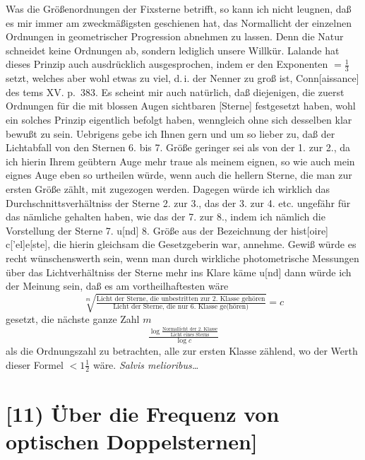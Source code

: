 \documentclass[12pt,a4paper]{article}
\theoremstyle{plain}
\theoremstyle{definition}
\theoremstyle{remark}
\begin{document}
Was die Gr\"o\ss enordnungen der Fixsterne betrifft, so kann ich nicht leugnen, da\ss{} es mir immer am zweckm\"a\ss igsten geschienen hat, das Normallicht der einzelnen Ordnungen in geometrischer Progression abnehmen zu lassen. Denn die Natur schneidet keine Ordnungen ab, sondern lediglich unsere Willk\"ur. Lalande hat dieses Prinzip auch ausdr\"ucklich ausgesprochen, indem er den Exponenten $= \tfrac{1}{3}$ setzt, welches aber wohl etwas zu viel, d.\,i. der Nenner zu gro\ss{} ist, Conn[aissance] des tems XV. p.~383. Es scheint mir auch nat\"urlich, da\ss{} diejenigen, die zuerst Ordnungen f\"ur die mit blossen Augen sichtbaren [Sterne] festgesetzt haben, wohl ein solches Prinzip eigentlich befolgt haben, wenngleich ohne sich desselben klar bewu\ss t zu sein. Uebrigens gebe ich Ihnen gern und um so lieber zu, da\ss{} der Lichtabfall von den Sternen 6. bis 7. Gr\"o\ss e geringer sei als von der 1. zur 2., da ich hierin Ihrem ge\"ubtern Auge mehr traue als meinem eignen, so wie auch mein eignes Auge eben so urtheilen w\"urde, wenn auch die hellern Sterne, die man zur ersten Gr\"o\ss e z\"ahlt, mit zugezogen werden. Dagegen w\"urde ich wirklich das Durchschnittsverh\"altniss der Sterne 2. zur 3., das der 3. zur 4. etc. ungef\"ahr f\"ur das n\"amliche gehalten haben, wie das der 7. zur 8., indem ich n\"amlich die Vorstellung der Sterne 7. u[nd] 8. Gr\"o\ss e aus der Bezeichnung der hist[oire] c['el]e[ste], die hierin gleichsam die Gesetzgeberin war, annehme. Gewi\ss{} w\"urde es recht w\"unschenswerth sein, wenn man durch wirkliche photometrische Messungen \"uber das Lichtverh\"altniss der Sterne mehr ins Klare k\"ame u[nd] dann w\"urde ich der Meinung sein, da\ss{} es am vortheilhaftesten w\"are
\[
\sqrt[m]{\tfrac{\text{Licht der Sterne, die unbestritten zur 2. Klasse geh\"oren}}{\text{Licht der Sterne, die nur 6. Klasse ge(h\"oren)}}} = c
\]
gesetzt, die n\"achste ganze Zahl $m$
\[
\tfrac{\log\tfrac{\text{Normallicht der 2. Klasse}}{\text{Licht eines Sterns}}}{\log c}
\]
als die Ordnungszahl zu betrachten, alle zur ersten Klasse z\"ahlend, wo der Werth dieser Formel $< 1\tfrac{1}{2}$ w\"are. \textit{Salvis melioribus\ldots}

\newpage

\section*{[11) \"Uber die Frequenz von optischen Doppelsternen]}
\end{document}
